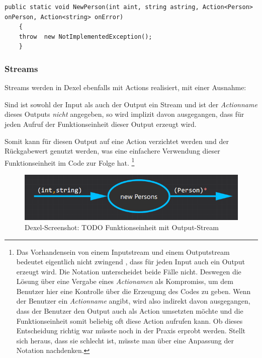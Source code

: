 	

	
	\begin{lstlisting}[caption=Mit Dexel generierter Code ]
	public static void NewPerson(int aint, string astring, Action<Person> onPerson, Action<string> onError)
	{
	throw  new NotImplementedException();
	}
	\end{lstlisting}
	 \subsubsection{Streams}

	Streams werden in Dexel ebenfalls mit Actions realisiert, mit einer Ausnahme:
	
	Sind ist sowohl der Input als auch der Output ein Stream und ist der \textit{Actionname} dieses Outputs \textit{nicht} angegeben, so wird  implizit davon ausgegangen, dass für jeden Aufruf der Funktionseinheit dieser Output erzeugt wird. 
	
	Somit kann für diesen Output auf eine Action verzichtet werden und der Rückgabewert genutzt werden, was eine einfachere Verwendung dieser Funktionseinheit im Code zur Folge hat.
	\footnote{	Das Vorhandensein von einem Inputstream und einem Outputstream bedeutet eigentlich nicht zwingend , dass für jeden Input auch ein	Output erzeugt wird. Die Notation unterscheidet beide Fälle nicht. Deswegen die Lösung über eine Vergabe eines \textit{Actionamen} als Kompromiss, um dem Benutzer hier eine Kontrolle über die Erzeugung des Codes zu geben. Wenn der Benutzer ein \textit{Actionname} angibt, wird also indirekt davon ausgegangen, dass der Benutzer den Output auch als Action umsetzten möchte und die Funktionseinheit somit beliebig oft diese Action aufrufen kann. Ob dieses Entscheidung richtig war müsste  noch in der Praxis erprobt werden. Stellt sich heraus,	dass sie schlecht ist, müsste man über eine Anpassung der Notation nachdenken.}
	
		
		\begin{figure}[H]
			\centering
			\includegraphics[width=.9\linewidth]{./img/roslyn_Stream.png} 
			\caption{Dexel-Screenshot: TODO Funktionseinheit mit Output-Stream}
		\end{figure}
		
	

